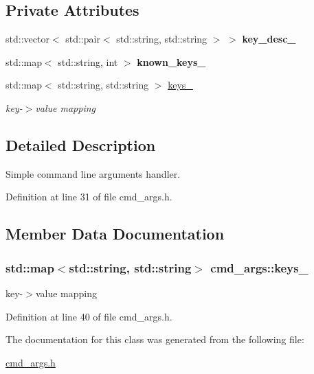 \subsection*{Private Attributes}
\begin{DoxyCompactItemize}
\item 
\hypertarget{classcmd__args_af29ce76646f940e6e26fcbd590d580b8}{}std\+::vector$<$ std\+::pair$<$ std\+::string, std\+::string $>$ $>$ {\bfseries key\+\_\+desc\+\_\+}\label{classcmd__args_af29ce76646f940e6e26fcbd590d580b8}

\item 
\hypertarget{classcmd__args_a1b718b64704208f3111ba3485ded61b8}{}std\+::map$<$ std\+::string, int $>$ {\bfseries known\+\_\+keys\+\_\+}\label{classcmd__args_a1b718b64704208f3111ba3485ded61b8}

\item 
std\+::map$<$ std\+::string, std\+::string $>$ \hyperlink{classcmd__args_a369b12b1a092c4ce9a782561e86081b1}{keys\+\_\+}
\begin{DoxyCompactList}\small\item\em key-\/$>$value mapping \end{DoxyCompactList}\end{DoxyCompactItemize}


\subsection{Detailed Description}
Simple command line arguments handler. 

Definition at line 31 of file cmd\+\_\+args.\+h.



\subsection{Member Data Documentation}
\hypertarget{classcmd__args_a369b12b1a092c4ce9a782561e86081b1}{}
\subsubsection[{keys\+\_\+}]{\setlength{\rightskip}{0pt plus 5cm}std\+::map$<$std\+::string, std\+::string$>$ cmd\+\_\+args\+::keys\+\_\+\hspace{0.3cm}{\ttfamily [private]}}\label{classcmd__args_a369b12b1a092c4ce9a782561e86081b1}


key-\/$>$value mapping 



Definition at line 40 of file cmd\+\_\+args.\+h.



The documentation for this class was generated from the following file\+:\begin{DoxyCompactItemize}
\item 
\hyperlink{cmd__args_8h}{cmd\+\_\+args.\+h}\end{DoxyCompactItemize}
